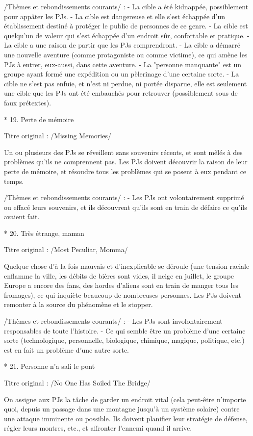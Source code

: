 \begin{enumerate}
/Thèmes et rebondissements courants/ :
- La cible a été kidnappée, possiblement pour appâter les PJs.
- La cible est dangereuse et elle s'est échappée d'un établissement destiné à protéger le public de personnes de ce genre.
- La cible est quelqu'un de valeur qui s'est échappée d'un endroit sûr, confortable et pratique.
- La cible a une raison de partir que les PJs comprendront.
- La cible a démarré une nouvelle aventure (comme protagoniste ou comme victime), ce qui amène les PJs à entrer, eux-aussi, dans cette aventure.
- La "personne manquante" est un groupe ayant formé une expédition ou un pèlerinage d'une certaine sorte.
- La cible ne s'est pas enfuie, et n'est ni perdue, ni portée disparue, elle est seulement une cible que les PJs ont été embauchés pour retrouver (possiblement sous de faux prétextes).

* 19. Perte de mémoire

Titre original : /Missing Memories/

Un ou plusieurs des PJs se réveillent sans souvenirs récents, et sont mêlés à des problèmes qu'ils ne comprennent pas. Les PJs doivent découvrir la raison de leur perte de mémoire, et résoudre tous les problèmes qui se posent à eux pendant ce temps.

/Thèmes et rebondissements courants/ :
- Les PJs ont volontairement supprimé ou effacé leurs souvenirs, et ils découvrent qu'ils sont en train de défaire ce qu'ils avaient fait.

* 20. Très étrange, maman

Titre original : /Most Peculiar, Momma/

Quelque chose d'à la fois mauvais et d'inexplicable se déroule (une tension raciale enflamme la ville, les débits de bières sont vides, il neige en juillet, le groupe Europe a encore des fans, des hordes d'aliens sont en train de manger tous les fromages), ce qui inquiète beaucoup de nombreuses personnes. Les PJs doivent remonter à la source du phénomène et le stopper.

/Thèmes et rebondissements courants/ :
- Les PJs sont involontairement responsables de toute l'histoire.
- Ce qui semble être un problème d'une certaine sorte (technologique, personnelle, biologique, chimique, magique, politique, etc.) est en fait un problème d'une autre sorte.

* 21. Personne n'a sali le pont

Titre original : /No One Has Soiled The Bridge/

On assigne aux PJs la tâche de garder un endroit vital (cela peut-être n'importe quoi, depuis un passage dans une montagne jusqu'à un système solaire) contre une attaque imminente ou possible. Ils doivent planifier leur stratégie de défense, régler leurs montres, etc., et affronter l'ennemi quand il arrive.


\end{enumerate}
